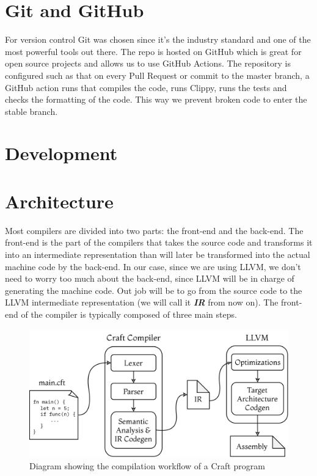 ﻿\documentclass[10pt,a4paper,twocolumn,twoside]{article}
\begin{document}
\section{Git and GitHub}
For version control Git was chosen since it's the industry standard and one of
the most powerful tools out there. The repo is hosted on GitHub which is great
for open source projects and allows us to use GitHub Actions. The repository is 
configured such as that on every Pull Request or commit to the master branch,
a GitHub action runs that compiles the code, runs Clippy, runs the tests and 
checks the formatting of the code. This way we prevent broken code to enter the
stable branch.

\section{Development}
\section{Architecture}
Most compilers are divided into two parts: the front-end and the back-end. The
front-end is the part of the compilers that takes the source code and transforms
it into an intermediate representation than will later be transformed into the
actual machine code by the back-end. In our case, since we are using LLVM, we
don't need to worry too much about the back-end, since LLVM will be in charge of
generating the machine code. Out job will be to go from the source code to the
LLVM intermediate representation (we will call it \textbf{\textit{IR}} from now
on). The front-end of the compiler is typically composed of three main steps.

\begin{figure}[ht]
\centering
\captionsetup{justification=centering,margin=1cm}
\includegraphics[width=\linewidth]{arch}
\caption{Diagram showing the compilation workflow of a Craft program}
\end{figure}
\end{document}
